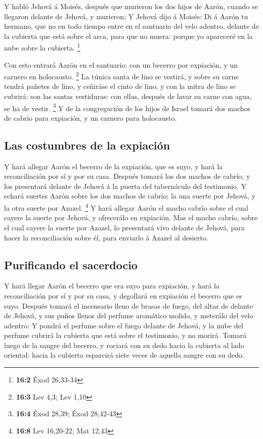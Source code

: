  Y habló Jehová á Moisés, después que murieron los dos hijos
de Aarón, cuando se llegaron delante de Jehová, y murieron; 
Y Jehová dijo á Moisés: Di á Aarón tu hermano, que no en todo tiempo
entre en el santuario del velo adentro, delante de la cubierta que está
sobre el arca, para que no muera: porque yo apareceré en la nube sobre
la cubierta. \footnote{\textbf{16:2} Éxod 26,33-34}

 Con esto entrará Aarón en el santuario: con un becerro por
expiación, y un carnero en holocausto. \footnote{\textbf{16:3} Lev 4,3;
  Lev 1,10}  La túnica santa de lino se vestirá, y sobre su
carne tendrá pañetes de lino, y ceñiráse el cinto de lino; y con la
mitra de lino se cubrirá: son las santas vestiduras: con ellas, después
de lavar su carne con agua, se ha de vestir. \footnote{\textbf{16:4}
  Éxod 28,39; Éxod 28,42-43}  Y de la congregación de los
hijos de Israel tomará dos machos de cabrío para expiación, y un carnero
para holocausto.

\hypertarget{las-costumbres-de-la-expiaciuxf3n}{%
\subsection{Las costumbres de la
expiación}\label{las-costumbres-de-la-expiaciuxf3n}}

 Y hará allegar Aarón el becerro de la expiación, que es
suyo, y hará la reconciliación por sí y por su casa. 
Después tomará los dos machos de cabrío, y los presentará delante de
Jehová á la puerta del tabernáculo del testimonio.  Y echará
suertes Aarón sobre los dos machos de cabrío; la una suerte por Jehová,
y la otra suerte por Azazel. \footnote{\textbf{16:8} Lev 16,20-22; Mat
  12,43}  Y hará allegar Aarón el macho cabrío sobre el cual
cayere la suerte por Jehová, y ofrecerálo en expiación. 
Mas el macho cabrío, sobre el cual cayere la suerte por Azazel, lo
presentará vivo delante de Jehová, para hacer la reconciliación sobre
él, para enviarlo á Azazel al desierto.

\hypertarget{purificando-el-sacerdocio}{%
\subsection{Purificando el sacerdocio}\label{purificando-el-sacerdocio}}

 Y hará llegar Aarón el becerro que era suyo para
expiación, y hará la reconciliación por sí y por su casa, y degollará en
expiación el becerro que es suyo.  Después tomará el
incensario lleno de brasas de fuego, del altar de delante de Jehová, y
sus puños llenos del perfume aromático molido, y meterálo del velo
adentro:  Y pondrá el perfume sobre el fuego delante de
Jehová, y la nube del perfume cubrirá la cubierta que está sobre el
testimonio, y no morirá.  Tomará luego de la sangre del
becerro, y rociará con su dedo hacia la cubierta al lado oriental: hacia
la cubierta esparcirá siete veces de aquella sangre con su dedo.

